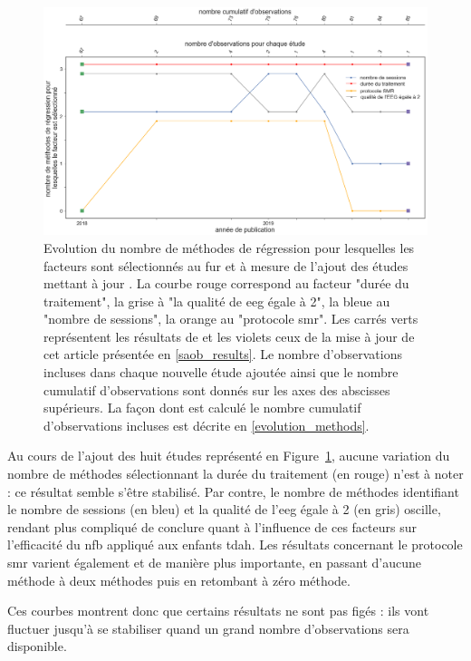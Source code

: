 \begin{figure}[h!]
  \centering
	\includegraphics[width=1\linewidth]{figures/chapter-3/factors-evolution-with-update} 
  \caption{Evolution du nombre de méthodes de régression pour lesquelles les facteurs sont sélectionnés au fur et à mesure de l'ajout des études mettant à jour \citet{Bussalb2019clinical}.
	La courbe rouge correspond au facteur "durée du traitement", la grise à "la qualité de \gls{eeg} égale à 2", la bleue au "nombre de sessions", la orange au "protocole \gls{smr}". 
	Les carrés verts représentent les résultats de \citet{Bussalb2019clinical} et les violets ceux de la mise à jour de cet article présentée en \ref{saob_results}.
	Le nombre d'observations incluses dans chaque nouvelle étude ajoutée ainsi que le nombre cumulatif d'observations sont donnés sur les axes des abscisses supérieurs.
	La façon dont est calculé le nombre cumulatif d'observations incluses est décrite en \ref{evolution_methods}.}
  \label{Figure:factors_evolution_with_update}
\end{figure}

Au cours de l'ajout des huit études représenté en Figure~\ref{Figure:factors_evolution_with_update}, aucune variation du nombre de méthodes sélectionnant la durée du traitement (en rouge) 
n'est à noter :
ce résultat semble s'être stabilisé. Par contre, le nombre de méthodes identifiant le nombre de sessions (en bleu) et la qualité de l'\gls{eeg} égale à 2 (en gris) oscille, rendant plus 
compliqué de conclure quant à l'influence de ces facteurs sur l'efficacité du \gls{nfb} appliqué aux enfants \gls{tdah}. Les résultats concernant le protocole \gls{smr} varient
également et de manière plus importante, en passant d'aucune méthode à deux méthodes puis en retombant à zéro méthode.

Ces courbes montrent donc que certains résultats ne sont pas figés : ils vont fluctuer jusqu'à se stabiliser quand un grand nombre d'observations sera disponible. 

